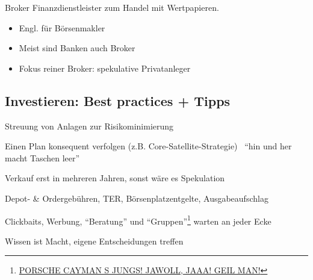 \documentclass{beamer}
\begin{document}
			\begin{frame}{Broker}
				Finanzdienstleister zum Handel mit Wertpapieren.
				\begin{itemize}
					\item Engl. für Börsenmakler
					\item Meist sind Banken auch Broker
					\item Fokus reiner Broker: spekulative Privatanleger
				\end{itemize}
			\end{frame}
		
		\subsection{Investieren: Best practices + Tipps}
		
			\begin{frame}
				\begin{description}[labelwidth=0cm]
					\item[Diversifikation] Streuung von Anlagen zur Risikominimierung
					\item[Strategie] Einen Plan konsequent verfolgen (z.B. Core-Satellite-Strategie) \textrightarrow\  "`hin und her macht Taschen leer"'
					\item[Geduld] Verkauf erst in mehreren Jahren, sonst wäre es Spekulation
					\item[Gebühren] Depot- \& Ordergebühren, TER, Börsenplatzentgelte, Ausgabeaufschlag
					\item[Nachdenken] Clickbaits, Werbung, "`Beratung"' und "`Gruppen"'\footnote{\href{https://www.youtube.com/watch?v=dM-8-KuKprA}{PORSCHE CAYMAN S JUNGS! JAWOLL, JAAA! GEIL MAN!}} warten an jeder Ecke
					\item[Bildung] Wissen ist Macht, eigene Entscheidungen treffen
				\end{description}
			\end{frame}
		
\end{document}
